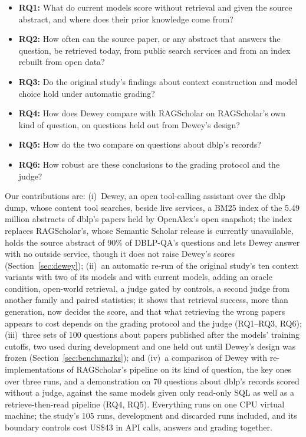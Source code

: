 \documentclass[conference]{IEEEtran}
\newcommand{\dq}{DBLP-QA}
\begin{document}
\begin{itemize}
\item \textbf{RQ1:} What do current models score without retrieval and given the source abstract, and
  where does their prior knowledge come from?
\item \textbf{RQ2:} How often can the source paper, or any abstract that answers the question, be
  retrieved today, from public search services and from an index rebuilt from open data?
\item \textbf{RQ3:} Do the original study's findings about context construction and model choice hold
  under automatic grading?
\item \textbf{RQ4:} How does Dewey compare with RAGScholar on RAGScholar's own kind of question, on
  questions held out from Dewey's design?
\item \textbf{RQ5:} How do the two compare on questions about dblp's records?
\item \textbf{RQ6:} How robust are these conclusions to the grading protocol and the judge?
\end{itemize}

Our contributions are: (i)~Dewey, an open tool-calling assistant over the dblp dump, whose content tool
searches, beside live services, a BM25 index of the 5.49 million abstracts of dblp's papers held by
OpenAlex's open snapshot; the index replaces RAGScholar's, whose Semantic Scholar release is currently
unavailable, holds the source abstract of 90\% of \dq{}'s questions and lets Dewey answer with no outside
service, though it does not raise Dewey's scores (Section~\ref{sec:dewey}); (ii)~an automatic re-run of
the original study's ten context variants with two of its models and with current models, adding an
oracle condition, open-world retrieval, a judge gated by controls, a second judge from another family and
paired statistics; it shows that retrieval success, more than generation, now decides the score, and
that what retrieving the wrong papers appears to cost depends on the grading protocol and the judge
(RQ1--RQ3, RQ6); (iii)~three sets of 100 questions about papers published after the models' training
cutoffs, two used during development and one held out until Dewey's design was frozen
(Section~\ref{sec:benchmarks}); and (iv)~a comparison of Dewey with re-implementations of RAGScholar's
pipeline on its kind of question, the key ones over three runs, and a demonstration on 70 questions
about dblp's records scored without a judge, against the same models given only read-only SQL as well as a
retrieve-then-read pipeline (RQ4, RQ5). Everything runs on one CPU virtual machine; the study's 105 runs, development
and discarded runs included, and its boundary controls cost US\$43 in API calls, answers and grading together.
\end{document}
